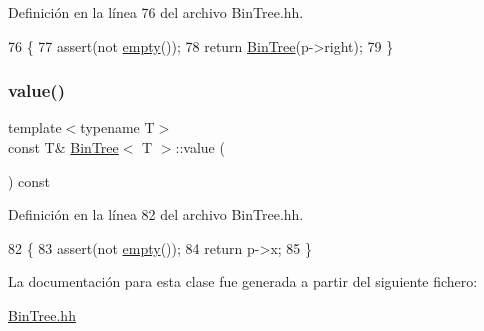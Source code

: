 Definición en la línea 76 del archivo Bin\+Tree.\+hh.


\begin{DoxyCode}
76                            \{
77         assert(not \mbox{\hyperlink{class_bin_tree_a74cda259ba5c25b8ee38ed4dc33e4fad}{empty}}());
78         \textcolor{keywordflow}{return} \mbox{\hyperlink{class_bin_tree_a47eef22d29cd023449d97c073c08e5b6}{BinTree}}(p->right);
79     \}
\end{DoxyCode}
\mbox{\label{class_bin_tree_a734e785b089c87b49187ee7c58edf5f3}} 
\subsubsection{\texorpdfstring{value()}{value()}}
{\footnotesize\ttfamily template$<$typename T$>$ \\
const T\& \mbox{\hyperlink{class_bin_tree}{Bin\+Tree}}$<$ T $>$\+::value (\begin{DoxyParamCaption}{ }\end{DoxyParamCaption}) const}



Definición en la línea 82 del archivo Bin\+Tree.\+hh.


\begin{DoxyCode}
82                             \{
83         assert(not \mbox{\hyperlink{class_bin_tree_a74cda259ba5c25b8ee38ed4dc33e4fad}{empty}}());
84         \textcolor{keywordflow}{return} p->x;
85     \}
\end{DoxyCode}


La documentación para esta clase fue generada a partir del siguiente fichero\+:\begin{DoxyCompactItemize}
\item 
\mbox{\hyperlink{_bin_tree_8hh}{Bin\+Tree.\+hh}}\end{DoxyCompactItemize}
